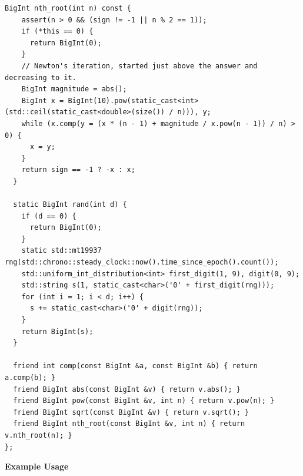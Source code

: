 \begin{lstlisting}[style=cpp]
  BigInt nth_root(int n) const {
    assert(n > 0 && (sign != -1 || n % 2 == 1));
    if (*this == 0) {
      return BigInt(0);
    }
    // Newton's iteration, started just above the answer and decreasing to it.
    BigInt magnitude = abs();
    BigInt x = BigInt(10).pow(static_cast<int>(std::ceil(static_cast<double>(size()) / n))), y;
    while (x.comp(y = (x * (n - 1) + magnitude / x.pow(n - 1)) / n) > 0) {
      x = y;
    }
    return sign == -1 ? -x : x;
  }

  static BigInt rand(int d) {
    if (d == 0) {
      return BigInt(0);
    }
    static std::mt19937 rng(std::chrono::steady_clock::now().time_since_epoch().count());
    std::uniform_int_distribution<int> first_digit(1, 9), digit(0, 9);
    std::string s(1, static_cast<char>('0' + first_digit(rng)));
    for (int i = 1; i < d; i++) {
      s += static_cast<char>('0' + digit(rng));
    }
    return BigInt(s);
  }

  friend int comp(const BigInt &a, const BigInt &b) { return a.comp(b); }
  friend BigInt abs(const BigInt &v) { return v.abs(); }
  friend BigInt pow(const BigInt &v, int n) { return v.pow(n); }
  friend BigInt sqrt(const BigInt &v) { return v.sqrt(); }
  friend BigInt nth_root(const BigInt &v, int n) { return v.nth_root(n); }
};
\end{lstlisting}
\textbf{Example Usage}\par
